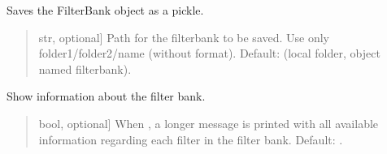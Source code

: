 \documentclass[letterpaper,10pt,english]{sphinxmanual}
\begin{document}
\begin{fulllineitems}
\begin{fulllineitems}
\label{\detokenize{classes:dsptools.classes.filterbank.FilterBank.save_filterbank}}
\pysigstartsignatures
{}
\pysigstopsignatures
\sphinxAtStartPar
Saves the FilterBank object as a pickle.
\begin{quote}\begin{description}
\begin{description}
\sphinxlineitem{\sphinxstylestrong{path}}{[}str, optional{]}
\sphinxAtStartPar
Path for the filterbank to be saved. Use only folder1/folder2/name
(without format). Default: 
(local folder, object named filterbank).

\end{description}

\end{description}\end{quote}

\end{fulllineitems}


\begin{fulllineitems}
\label{\detokenize{classes:dsptools.classes.filterbank.FilterBank.show_info}}
\pysigstartsignatures
{}
\pysigstopsignatures
\sphinxAtStartPar
Show information about the filter bank.
\begin{quote}\begin{description}
\begin{description}
\sphinxlineitem{\sphinxstylestrong{show\_filters\_info}}{[}bool, optional{]}
\sphinxAtStartPar
When , a longer message is printed with all available
information regarding each filter in the filter bank.
Default: .

\end{description}

\end{description}\end{quote}

\end{fulllineitems}


\end{fulllineitems}
\end{document}
